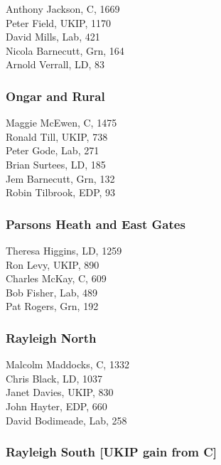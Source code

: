 \documentclass[a4paper,openany,10pt]{book}
\begin{document}
Anthony Jackson, C, 1669\\
Peter Field, UKIP, 1170\\
David Mills, Lab, 421\\
Nicola Barnecutt, Grn, 164\\
Arnold Verrall, LD, 83\\


\subsubsection*{Ongar and Rural}



Maggie McEwen, C, 1475\\
Ronald Till, UKIP, 738\\
Peter Gode, Lab, 271\\
Brian Surtees, LD, 185\\
Jem Barnecutt, Grn, 132\\
Robin Tilbrook, EDP, 93\\


\subsubsection*{Parsons Heath and East Gates}



Theresa Higgins, LD, 1259\\
Ron Levy, UKIP, 890\\
Charles McKay, C, 609\\
Bob Fisher, Lab, 489\\
Pat Rogers, Grn, 192\\


\subsubsection*{Rayleigh North}



Malcolm Maddocks, C, 1332\\
Chris Black, LD, 1037\\
Janet Davies, UKIP, 830\\
John Hayter, EDP, 660\\
David Bodimeade, Lab, 258\\


\subsubsection*{Rayleigh South \hspace*{\fill}\nolinebreak[1]%
\enspace\hspace*{\fill}
[UKIP gain from C]}
\end{document}
